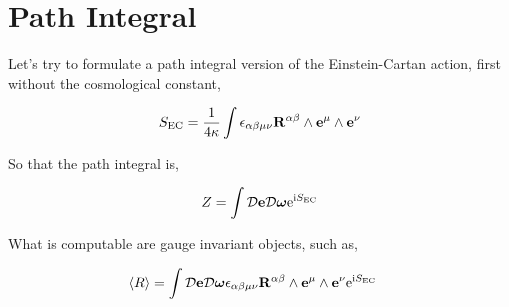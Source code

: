 \section{Path Integral}

Let's try to formulate a path integral version of the Einstein-Cartan action, first without the cosmological constant,

\[S_{\textnormal{EC}}=\frac{1}{4\kappa}\int\epsilon_{\alpha\beta\mu\nu}\vb R^{\alpha\beta}\wedge\vb e^\mu\wedge\vb e^\nu\]

So that the path integral is,

\[Z=\int\mathcal D \vb e\mathcal D \boldsymbol \omega\textnormal{e}^{\textnormal{i} S_{\textnormal{EC}}}\]

What is computable are gauge invariant objects, such as,

\begin{align*}
    \expval{R}&=\int\mathcal D \vb e\mathcal D \boldsymbol \omega\epsilon_{\alpha\beta\mu\nu}\vb R^{\alpha\beta}\wedge\vb e^\mu\wedge\vb e^\nu\textnormal{e}^{\textnormal{i} S_{\textnormal{EC}}}
\end{align*}